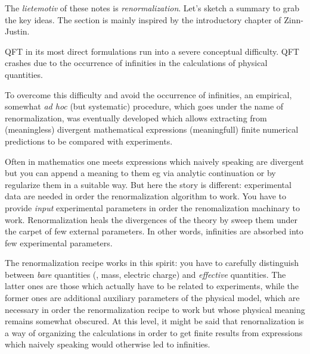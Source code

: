 




The \emph{lietemotiv} of these notes is \emph{renormalization}. Let's sketch a
summary to grab the key
ideas. The section is mainly inspired by the introductory chapter of
Zinn-Justin.

QFT in its most direct formulations run into a severe conceptual
difficulty.
QFT crashes due to the occurrence of infinities in the calculations of physical
quantities.

To overcome this difficulty and avoid the occurrence of infinities, an empirical, somewhat \emph{ad hoc} (but
systematic) procedure,
which goes under the name of renormalization, was eventually developed which allows extracting from
(meaningless) divergent mathematical expressions
(meaningfull) finite numerical predictions to be compared with experiments.


Often in mathematics one meets expressions which naively speaking are divergent
but you can append a meaning to them eg via analytic continuation or by
regularize them in a suitable way.
But here the story is different:
experimental data are needed in order the renormalization algorithm to work.
You have to provide \emph{input} experimental parameters in order the
renomalization machinary to work. 
Renormalization heals the divergences of the theory by sweep them 
under the carpet of few external parameters.
In other words, infinities are absorbed into few experimental parameters.

The renormalization recipe works in this spirit: you have to carefully
distinguish between \emph{bare} quantities (\eg, mass, electric charge) and
\emph{effective}
quantities. The latter ones are those which actually have to be related to
experiments, while the former ones are additional auxiliary parameters of the
physical model, which are necessary in order the renormalization recipe to work
but whose physical meaning remains somewhat obscured.
At this level, it might be said that renornalization is a way of organizing the
calculations in order to get finite results from expressions which naively
speaking would otherwise led to infinities.


